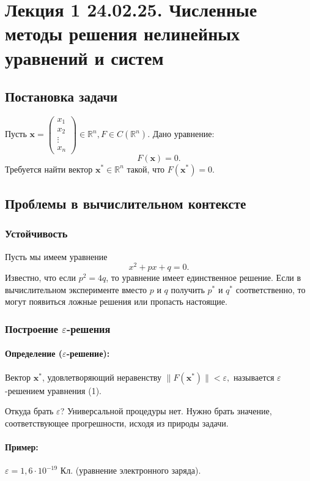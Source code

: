 \section{Лекция 1 24.02.25. Численные методы решения нелинейных уравнений и систем}
\subsection{Постановка задачи}
Пусть $\mathbf{x} = \begin{pmatrix} 
x_1    \\ 
x_2    \\ 
\vdots \\ 
x_n    
\end{pmatrix} \in \mathbb{R}^n, F \in C(\mathbb{R}^n).
$
Дано уравнение:
\begin{equation}
F(\mathbf{x}) = 0. 
\end{equation}
Требуется найти вектор $\mathbf{x^*} \in \mathbb{R}^n$ такой, что $F(\mathbf{x^*}) = 0$.
\subsection{Проблемы в вычислительном контексте}
\subsubsection{Устойчивость}
Пусть мы имеем уравнение
\[
x^2 + px + q = 0.
\]
Известно, что если $p^2 = 4q$,
то уравнение имеет единственное решение.
Если в вычислительном эксперименте вместо $p$ и $q$ получить $p^*$ и $q^*$ соответственно, то могут появиться ложные решения или пропасть настоящие.
\subsubsection{Построение $\varepsilon$-решения}
\paragraph{Определение ($\varepsilon$-решение):} Вектор $\mathbf{x^*}$, удовлетворяющий неравенству
$
\|F(\mathbf{x^*})\| < \varepsilon,
$
называется $\varepsilon$-решением уравнения (1).

Откуда брать $\varepsilon$? Универсальной процедуры нет. Нужно брать значение, соответствующее прогрешности, исходя из природы задачи.
\paragraph{Пример:} 
$\varepsilon = 1,6 \cdot 10^{-19}$ Кл. (уравнение электронного заряда).

